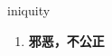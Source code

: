 
\begin{frame}
{\huge iniquity}
\begin{center}
\begin{enumerate}\Large
  \item \textbf{邪恶，不公正}
\end{enumerate}
\end{center}
\end{frame}
